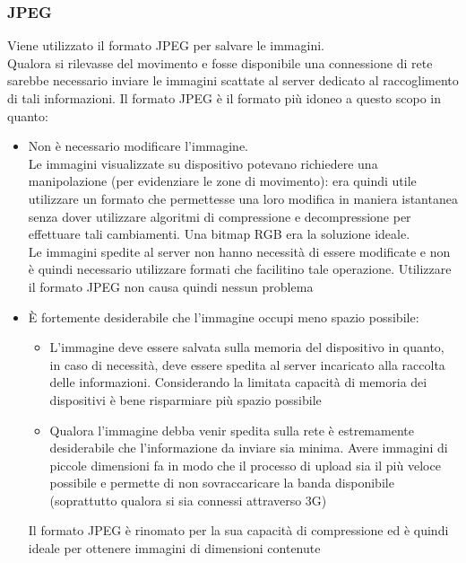 \subsubsection{JPEG}
Viene utilizzato il formato JPEG per salvare le immagini.\\
Qualora si rilevasse del movimento e fosse disponibile una connessione di rete sarebbe necessario inviare le immagini scattate al server dedicato al raccoglimento di tali informazioni. Il formato JPEG è il formato più idoneo a questo scopo in quanto:
\begin{itemize}
  \item Non è necessario modificare l'immagine.\\
  Le immagini visualizzate su dispositivo potevano richiedere una manipolazione (per evidenziare le zone di movimento): era quindi utile utilizzare un formato che permettesse una loro modifica in maniera istantanea senza dover utilizzare algoritmi di compressione e decompressione per effettuare tali cambiamenti. Una bitmap RGB era la soluzione ideale.\\
  Le immagini spedite al server non hanno necessità di essere modificate e non è quindi necessario utilizzare formati che facilitino tale operazione. Utilizzare il formato JPEG non causa quindi nessun problema
  \item \`E fortemente desiderabile che l'immagine occupi meno spazio possibile:
  \begin{itemize}
    \item L'immagine deve essere salvata sulla memoria del dispositivo in quanto, in caso di necessità, deve essere spedita al server incaricato alla raccolta delle informazioni. Considerando la limitata capacità di memoria dei dispositivi è bene risparmiare più spazio possibile
    \item Qualora l'immagine debba venir spedita sulla rete è estremamente desiderabile che l'informazione da inviare sia minima. Avere immagini di piccole dimensioni fa in modo che il processo di upload sia il più veloce possibile e permette di non sovraccaricare la banda disponibile (soprattutto qualora si sia connessi attraverso 3G)
  \end{itemize}
  Il formato JPEG è rinomato per la sua capacità di compressione ed è quindi ideale per ottenere immagini di dimensioni contenute
\end{itemize}

